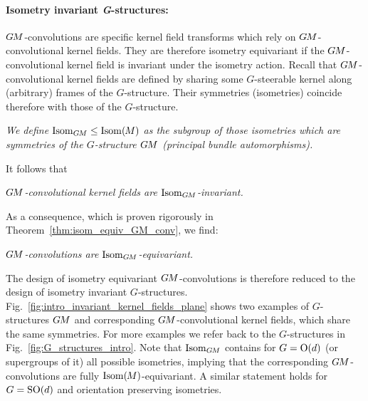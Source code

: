 \paragraph{Isometry invariant \textit{G}-structures:}
$G\mkern-1.4muM$-convolutions are specific kernel field transforms
which rely on $G\mkern-1.4muM$-convolutional kernel fields.
They are therefore isometry equivariant if the $G\mkern-1.4muM$-convolutional kernel field is invariant under the isometry action.
Recall that $G\mkern-1.4muM$-convolutional kernel fields are defined by sharing some $G$-steerable kernel along (arbitrary) frames of the $G$-structure.
Their symmetries (isometries) coincide therefore with those of the $G$-structure.
\begin{center}\it
    We define $\operatorname{Isom}_{G\mkern-1.4muM} \leq \operatorname{Isom}(\mkern-1.5mu M \mkern-.5mu)$ as the subgroup of those isometries which are \\
    symmetries of the $G$-structure $G\mkern-1.4muM$ (principal bundle automorphisms).
\end{center}
\begin{minipage}{\textwidth}
It follows that
\begin{center}\it
    $G\mkern-1.4muM$-convolutional kernel fields are $\operatorname{Isom}_{G\mkern-1.4muM}$-invariant.
\end{center}
\vspace*{1ex}\end{minipage}
\begin{minipage}{\textwidth}
As a consequence, which is proven rigorously in Theorem~\ref{thm:isom_equiv_GM_conv}, we find:
\begin{center}\it
    $G\mkern-1.4muM$-convolutions are $\operatorname{Isom}_{G\mkern-1.4muM}$-equivariant.
\end{center}
\vspace*{1ex}\end{minipage}
The design of isometry equivariant $G\mkern-1.4muM$-convolutions is therefore reduced to the design of isometry invariant $G$-structures.
Fig.~\ref{fig:intro_invariant_kernel_fields_plane} shows two examples of $G$-structures $G\mkern-1.4muM$ and corresponding $G\mkern-1.4muM$-convolutional kernel fields, which share the same symmetries.
For more examples we refer back to the $G$-structures in Fig.~\ref{fig:G_structures_intro}.
Note that $\operatorname{Isom}_{G\mkern-1.4muM}$ contains for $G=\operatorname{O}(d)$ (or supergroups of it) all possible isometries, implying that the corresponding $G\mkern-1.4muM$-convolutions are fully $\operatorname{Isom}(\mkern-1.5mu M \mkern-.5mu)$-equivariant.
A similar statement holds for $G=\operatorname{SO}(d)$ and orientation preserving isometries.


